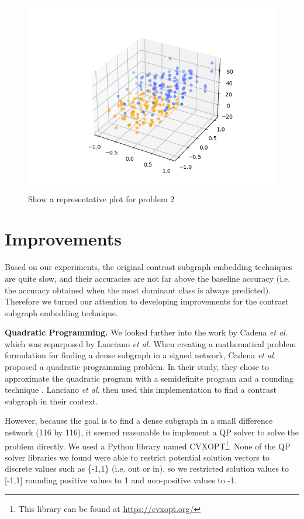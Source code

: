 \documentclass[letterpaper]{article}
\begin{document}
\begin{figure}
    \centering
    \includegraphics[width=\columnwidth, keepaspectratio=true]{test.png}
    \caption{Show a representative plot for problem 2}
    \label{fig:prob2}
\end{figure}




\section{Improvements} \label{improvements}

Based on our experiments, the original contrast subgraph embedding techniques are quite slow, and their accuracies are not far above the baseline accuracy (i.e. the accuracy obtained when the most dominant class is always predicted).
Therefore we turned our attention to developing improvements for the contrast subgraph embedding technique.

\textbf{Quadratic Programming.}
We looked further into the work by Cadena \emph{et al.} which was repurposed by Lanciano \emph{et al.}
When creating a mathematical problem formulation for finding a dense subgraph in a signed network, Cadena \emph{et al.} proposed a quadratic programming problem.
In their study, they chose to approximate the quadratic program with a semidefinite program and a rounding technique \cite{cadena2016}.
Lanciano \emph{et al.} then used this implementation to find a contrast subgraph in their context.

However, because the goal is to find a dense subgraph in a small difference network (116 by 116), it seemed reasonable to implement a QP solver to solve the problem directly.
We used a Python library named CVXOPT\footnote{This library can be found at \url{https://cvxopt.org/}}.
None of the QP solver libraries we found were able to restrict potential solution vectors to discrete values such as \{-1,1\} (i.e. out or in), so we restricted solution values to [-1,1] rounding positive values to 1 and non-positive values to -1.
\end{document}
